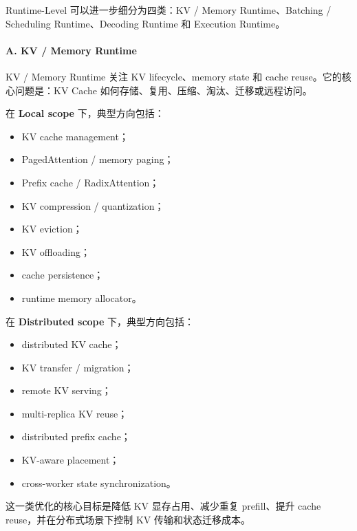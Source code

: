 \documentclass[a4paper,10pt]{ctexart}
\begin{document}
Runtime-Level 可以进一步细分为四类：KV / Memory Runtime、Batching / Scheduling Runtime、Decoding Runtime 和 Execution Runtime。


\paragraph*{A. KV / Memory Runtime}

KV / Memory Runtime 关注 KV lifecycle、memory state 和 cache reuse。它的核心问题是：KV Cache 如何存储、复用、压缩、淘汰、迁移或远程访问。


在 \textbf{Local scope} 下，典型方向包括：


\begin{itemize}
\item KV cache management；

\item PagedAttention / memory paging；

\item Prefix cache / RadixAttention；

\item KV compression / quantization；

\item KV eviction；

\item KV offloading；

\item cache persistence；

\item runtime memory allocator。

\end{itemize}
在 \textbf{Distributed scope} 下，典型方向包括：


\begin{itemize}
\item distributed KV cache；

\item KV transfer / migration；

\item remote KV serving；

\item multi-replica KV reuse；

\item distributed prefix cache；

\item KV-aware placement；

\item cross-worker state synchronization。

\end{itemize}
这一类优化的核心目标是降低 KV 显存占用、减少重复 prefill、提升 cache reuse，并在分布式场景下控制 KV 传输和状态迁移成本。
\end{document}

